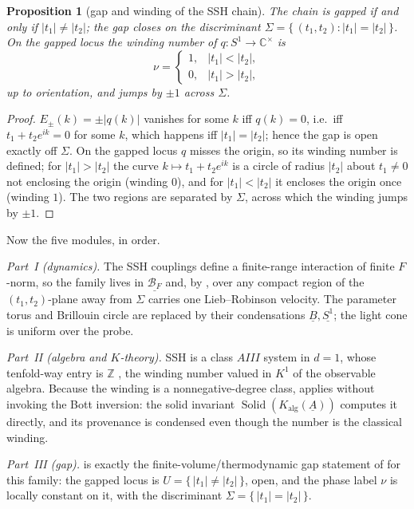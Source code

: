 \documentclass[12pt]{article}
\newcommand{\cond}[1]{\underline{#1}}          %
\newcommand{\Ffun}{F}                          %
\newcommand{\BF}{\mathcal{B}_{F}}              %
\newcommand{\Sig}{\Sigma}                       %
\newcommand{\Kalg}{K_{\mathrm{alg}}}           %
\newcommand{\Solid}{\operatorname{Solid}}      %
\newcommand{\CC}{\mathbb{C}}
\newcommand{\ZZ}{\mathbb{Z}}
\newcommand{\abs}[1]{\lvert #1 \rvert}
\newcommand{\set}[1]{\{\,#1\,\}}
\theoremstyle{plain}
\newtheorem{proposition}[proposition]{Proposition}
\theoremstyle{definition}
\theoremstyle{remark}
\begin{document}
\begin{proposition}[gap and winding of the SSH chain]
\label{prop:sshgap}
The chain is gapped if and only if $\abs{t_1}\ne\abs{t_2}$; the gap closes on the
discriminant $\Sig=\set{(t_1,t_2):\abs{t_1}=\abs{t_2}}$. On the gapped locus the winding
number of $q:S^1\to\CC^\times$ is
\[
\nu=\begin{cases}1,&\abs{t_1}<\abs{t_2},\\ 0,&\abs{t_1}>\abs{t_2},\end{cases}
\]
up to orientation, and jumps by $\pm1$ across $\Sig$.
\end{proposition}

\begin{proof}
$E_\pm(k)=\pm\abs{q(k)}$ vanishes for some $k$ iff $q(k)=0$, i.e.\ iff $t_1+t_2e^{ik}=0$
for some $k$, which happens iff $\abs{t_1}=\abs{t_2}$; hence the gap is open exactly off
$\Sig$. On the gapped locus $q$ misses the origin, so its winding number is defined; for
$\abs{t_1}>\abs{t_2}$ the curve $k\mapsto t_1+t_2e^{ik}$ is a circle of radius
$\abs{t_2}$ about $t_1\ne0$ not enclosing the origin (winding $0$), and for
$\abs{t_1}<\abs{t_2}$ it encloses the origin once (winding $1$). The two regions are
separated by $\Sig$, across which the winding jumps by $\pm1$.
\end{proof}

Now the five modules, in order.

\emph{Part~I (dynamics).} The SSH couplings define a finite-range interaction of finite
$\Ffun$-norm, so the family lives in $\cond{\BF}$ and, by , over any compact
region of the $(t_1,t_2)$-plane away from $\Sig$ carries one Lieb--Robinson velocity. The
parameter torus and Brillouin circle are replaced by their condensations
$\cond{B},\cond{S^1}$; the light cone is uniform over the probe.

\emph{Part~II (algebra and $K$-theory).} SSH is a class $\mathit{AIII}$ system in $d=1$,
whose tenfold-way entry is $\ZZ$ \cite{kitaev-periodic-table,altland-zirnbauer}, the
winding number valued in $K^1$ of the observable algebra. Because the winding is a
nonnegative-degree class,  applies without invoking the Bott inversion:
the solid invariant $\Solid(\Kalg(\cond{A}))$ computes it directly, and its provenance is
condensed even though the number is the classical winding.

\emph{Part~III (gap).}  is exactly the finite-volume/thermodynamic gap
statement of  for this family: the gapped locus is
$U=\set{\abs{t_1}\ne\abs{t_2}}$, open, and the phase label $\nu$ is locally constant on
it, with the discriminant $\Sig=\set{\abs{t_1}=\abs{t_2}}$.
\end{document}
